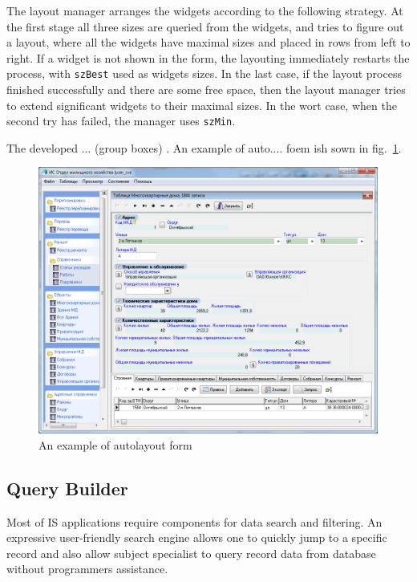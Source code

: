 \documentclass[conference]{IEEEtran}
\begin{document}
The layout manager arranges the widgets according to the following strategy.  At the first stage all three sizes are queried from the widgets, and tries to figure out a layout, where all the widgets have maximal sizes and placed in rows from left to right.  If a widget is not shown in the form, the layouting immediately restarts the process, with \texttt{szBest} used as widgets sizes.  In the last case, if the layout process finished successfully and there are some free space, then the layout manager tries to extend significant widgets to their maximal sizes.  In the wort case, when the second try has failed, the manager uses \texttt{szMin}.

The developed ... (group boxes) . An example of auto.... foem ish sown in fig.~\ref{fig:formex}.

\begin{figure}[tb]
  \centering
  \includegraphics[width=\linewidth]{formex.png}
  \caption{An example of autolayout form}
  \label{fig:formex}
\end{figure}

\subsection{Query Builder}
\label{sec:query-builder}

Most of IS applications require components for data search and filtering.  An expressive user-friendly search engine allows one to quickly jump to a specific record and also allow subject specialist to query record data from database without programmers assistance.
\end{document}
